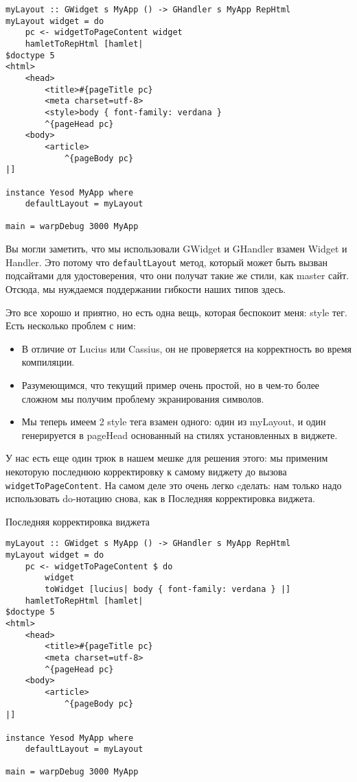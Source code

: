 \begin{lstlisting}
myLayout :: GWidget s MyApp () -> GHandler s MyApp RepHtml
myLayout widget = do
    pc <- widgetToPageContent widget
    hamletToRepHtml [hamlet|
$doctype 5
<html>
    <head>
        <title>#{pageTitle pc}
        <meta charset=utf-8>
        <style>body { font-family: verdana }
        ^{pageHead pc}
    <body>
        <article>
            ^{pageBody pc}
|]

instance Yesod MyApp where
    defaultLayout = myLayout

main = warpDebug 3000 MyApp
\end{lstlisting}

Вы могли заметить, что мы использовали GWidget и GHandler взамен Widget и Handler. Это потому что \lstinline'defaultLayout' метод, который может быть вызван подсайтами для удостоверения, что они получат такие же стили, как master сайт. Отсюда, мы нуждаемся поддержании гибкости наших типов здесь.

Это все хорошо и приятно, но есть одна вещь, которая беспокоит меня: style тег. Есть несколько проблем с ним:
\begin{itemize}
\item В отличие от Lucius или Cassius, он не проверяется на корректность во время компиляции.
\item Разумеющимся, что текущий пример очень простой, но в чем-то более сложном мы получим проблему экранирования символов.
\item Мы теперь имеем 2 style тега взамен одного: один из myLayout, и один генерируется в pageHead основанный на стилях установленных в виджете.
\end{itemize}

У нас есть еще один трюк в нашем мешке для решения этого: мы применим некоторую последнюю корректировку к самому виджету до вызова \lstinline'widgetToPageContent'. На самом деле это очень легко cделать: нам только надо использовать do-нотацию снова, как в Последняя корректировка виджета.

Последняя корректировка виджета

\begin{lstlisting}
myLayout :: GWidget s MyApp () -> GHandler s MyApp RepHtml
myLayout widget = do
    pc <- widgetToPageContent $ do
        widget
        toWidget [lucius| body { font-family: verdana } |]
    hamletToRepHtml [hamlet|
$doctype 5
<html>
    <head>
        <title>#{pageTitle pc}
        <meta charset=utf-8>
        ^{pageHead pc}
    <body>
        <article>
            ^{pageBody pc}
|]

instance Yesod MyApp where
    defaultLayout = myLayout

main = warpDebug 3000 MyApp
\end{lstlisting}

